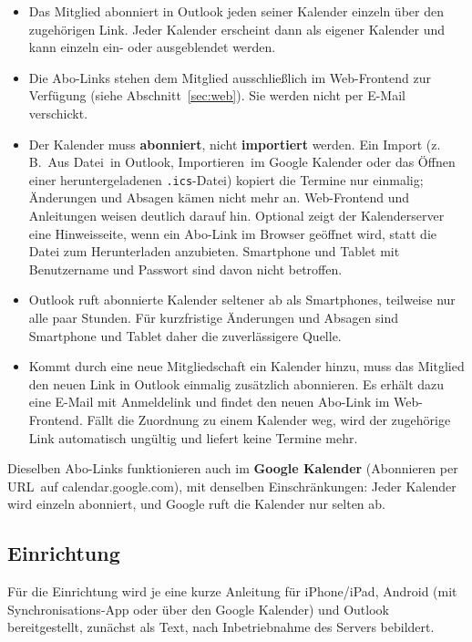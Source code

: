 \documentclass[a4paper,fontsize=10pt]{scrartcl}
\begin{document}
\begin{itemize}
  \item Das Mitglied abonniert in Outlook jeden seiner Kalender einzeln über
        den zugehörigen Link. Jeder Kalender erscheint dann als eigener
        Kalender und kann einzeln ein- oder ausgeblendet werden.
  \item Die Abo-Links stehen dem Mitglied ausschließlich im Web-Frontend zur
        Verfügung (siehe Abschnitt~\ref{sec:web}). Sie werden nicht per
        E-Mail verschickt.
  \item Der Kalender muss \textbf{abonniert}, nicht \textbf{importiert}
        werden. Ein Import (z.\,B.\ \glqq Aus Datei\grqq\ in Outlook,
        \glqq Importieren\grqq\ im Google Kalender oder das Öffnen einer
        heruntergeladenen \texttt{.ics}-Datei) kopiert die Termine nur
        einmalig; Änderungen und Absagen kämen nicht mehr an. Web-Frontend
        und Anleitungen weisen deutlich darauf hin. Optional zeigt der
        Kalenderserver eine Hinweisseite, wenn ein Abo-Link im Browser
        geöffnet wird, statt die Datei zum Herunterladen anzubieten.
        Smartphone und Tablet mit Benutzername und Passwort sind davon nicht
        betroffen.
  \item Outlook ruft abonnierte Kalender seltener ab als Smartphones,
        teilweise nur alle paar Stunden. Für kurzfristige Änderungen
        und Absagen sind Smartphone und Tablet daher die zuverlässigere
        Quelle.
  \item Kommt durch eine neue Mitgliedschaft ein Kalender hinzu, muss das
        Mitglied den neuen Link in Outlook einmalig zusätzlich abonnieren.
        Es erhält dazu eine E-Mail mit Anmeldelink und findet den neuen
        Abo-Link im Web-Frontend.
        Fällt die Zuordnung zu einem Kalender weg, wird der zugehörige Link
        automatisch ungültig und liefert keine Termine mehr.
\end{itemize}

Dieselben Abo-Links funktionieren auch im \textbf{Google Kalender}
(Abonnieren \glqq per URL\grqq\ auf calendar.google.com), mit denselben
Einschränkungen: Jeder Kalender wird einzeln abonniert, und Google ruft die
Kalender nur selten ab.

\subsection*{Einrichtung}

Für die Einrichtung wird je eine kurze Anleitung für iPhone/iPad, Android
(mit Synchronisations-App oder über den Google Kalender) und Outlook
bereitgestellt, zunächst als Text, nach Inbetriebnahme des Servers
bebildert.
\end{document}
